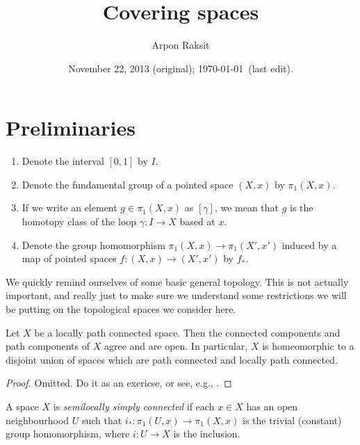 


\title{Covering spaces}
\author{Arpon Raksit}
\date{November 22, 2013 (original); \today\ (last edit).}


\maketitle
\thispagestyle{fancy}


\section{Preliminaries}

\begin{notation}
  \begin{enumerate}[leftmargin=*]
  \item Denote the interval $[0,1]$ by $I$.
  \item Denote the fundamental group of a pointed space $(X,x)$ by
    $\pi_1(X,x)$.
  \item If we write an element $g \in \pi_1(X,x)$ as $[\gamma]$, we
    mean that $g$ is the homotopy class of the loop $\gamma : I \to X$
    based at $x$.
  \item Denote the group homomorphism $\pi_1(X,x) \to \pi_1(X',x')$
    induced by a map of pointed spaces $f : (X,x) \to (X',x')$ by
    $f_*$.
  \end{enumerate}
\end{notation}

We quickly remind ourselves of some basic general topology. This is
not actually important, and really just to make sure we understand
some restrictions we will be putting on the topological spaces we
consider here.

\begin{proposition}
  \label{locpathconn}
  Let $X$ be a locally path connected space. Then the connected
  components and path components of $X$ agree and are open. In
  particular, $X$ is homeomorphic to a disjoint union of spaces which
  are path connected and locally path connected.
\end{proposition}

\begin{proof}
  Omitted. Do it as an exericse, or see, e.g., \cite{munkres}.
\end{proof}

\begin{definition}
  A space $X$ is \emph{semilocally simply connected} if each $x \in X$
  has an open neighbourhood $U$ such that $i_* : \pi_1(U,x) \to
  \pi_1(X,x)$ is the trivial (constant) group homomorphism, where $i :
  U \to X$ is the inclusion.
\end{definition}

